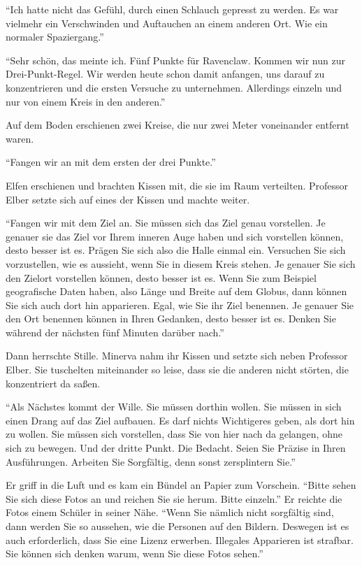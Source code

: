 \enquote{Ich hatte nicht das Gefühl, durch einen Schlauch gepresst zu werden. Es war vielmehr ein Verschwinden und Auftauchen an einem anderen Ort. Wie ein normaler Spaziergang.}

\enquote{Sehr schön, das meinte ich. Fünf Punkte für Ravenclaw. \gst Kommen wir nun zur Drei-Punkt-Regel. Wir werden heute schon damit anfangen, uns darauf zu konzentrieren und die ersten Versuche zu unternehmen. Allerdings einzeln und nur von einem Kreis in den anderen.}

Auf dem Boden erschienen zwei Kreise, die nur zwei Meter voneinander entfernt waren.

\enquote{Fangen wir an mit dem ersten der drei Punkte.}

Elfen erschienen und brachten Kissen mit, die sie im Raum verteilten. Professor Elber setzte sich auf eines der Kissen und machte weiter.

\enquote{Fangen wir mit dem Ziel an. Sie müssen sich das Ziel genau vorstellen. Je genauer sie das Ziel vor Ihrem inneren Auge haben und sich vorstellen können, desto besser ist es. Prägen Sie sich also die Halle einmal ein. Versuchen Sie sich vorzustellen, wie es aussieht, wenn Sie in diesem Kreis stehen. Je genauer Sie sich den Zielort vorstellen können, desto besser ist es. Wenn Sie zum Beispiel geografische Daten haben, also Länge und Breite auf dem Globus, dann können Sie sich auch dort hin apparieren. Egal, wie Sie ihr Ziel benennen. Je genauer Sie den Ort benennen können in Ihren Gedanken, desto besser ist es. Denken Sie während der nächsten fünf Minuten darüber nach.}

Dann herrschte Stille. Minerva nahm ihr Kissen und setzte sich neben Professor Elber. Sie tuschelten miteinander so leise, dass sie die anderen nicht störten, die konzentriert da saßen.

\enquote{Als Nächstes kommt der Wille. Sie müssen dorthin wollen. Sie müssen in sich einen Drang auf das Ziel aufbauen. Es darf nichts Wichtigeres geben, als dort hin zu wollen. Sie müssen sich vorstellen, dass Sie von hier nach da gelangen, ohne sich zu bewegen. Und der dritte Punkt. Die Bedacht. Seien Sie Präzise in Ihren Ausführungen. Arbeiten Sie Sorgfältig, denn sonst zersplintern Sie.}

Er griff in die Luft und es kam ein Bündel an Papier zum Vorschein. \enquote{Bitte sehen Sie sich diese Fotos an und reichen Sie sie herum. Bitte einzeln.} Er reichte die Fotos einem Schüler in seiner Nähe. \enquote{Wenn Sie nämlich nicht sorgfältig sind, dann werden Sie so aussehen, wie die Personen auf den Bildern. Deswegen ist es auch erforderlich, dass Sie eine Lizenz erwerben. Illegales Apparieren ist strafbar. Sie können sich denken warum, wenn Sie diese Fotos sehen.}

